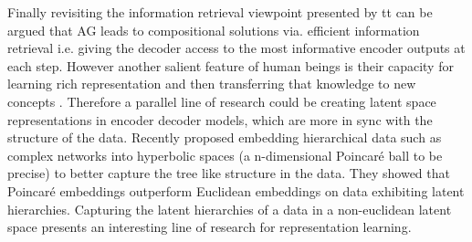 Finally revisiting the information retrieval viewpoint presented by \cite{Vaswani2017} tt can be argued that AG leads to compositional solutions via. efficient information retrieval  i.e. giving the decoder access to the most informative encoder outputs at each step. However another salient feature of human beings is their capacity for learning rich representation and then transferring that knowledge to new concepts \citep{Lake2015}. Therefore a parallel line of research could be creating latent space representations in encoder decoder models,  which are more in sync with the structure of the data. Recently \cite{Nickel2017} proposed embedding hierarchical data such as complex networks into hyperbolic spaces (a n-dimensional Poincar\'e ball to be precise) to better capture the tree like structure in the data. They showed that Poincar\'e embeddings outperform Euclidean embeddings on data exhibiting latent hierarchies. Capturing the latent hierarchies of a data in a non-euclidean latent space presents an interesting line of research for representation learning.
